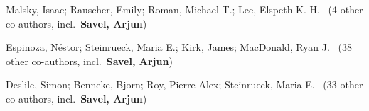 


\item[{\color{numcolor}\scriptsize3}] Malsky, Isaac; Rauscher, Emily; Roman, Michael T.; Lee, Elspeth K. H. \etal\ ({4} other co-authors, incl.\ \textbf{Savel, Arjun})
\item[{\color{numcolor}\scriptsize2}] Espinoza, Néstor; Steinrueck, Maria E.; Kirk, James; MacDonald, Ryan J. \etal\ ({38} other co-authors, incl.\ \textbf{Savel, Arjun})
\item[{\color{numcolor}\scriptsize1}] Deslile, Simon; Benneke, Bjorn; Roy, Pierre-Alex; Steinrueck, Maria E. \etal\ ({33} other co-authors, incl.\ \textbf{Savel, Arjun})
